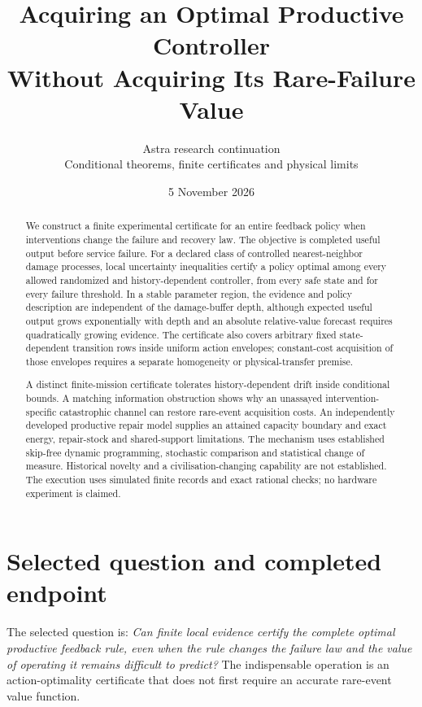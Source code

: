 \documentclass[10pt,a4paper]{article}
\title{Acquiring an Optimal Productive Controller\\Without Acquiring Its Rare-Failure Value}
\author{Astra research continuation\\Conditional theorems, finite certificates and physical limits}
\date{5 November 2026}
\begin{document}
\maketitle
\begin{abstract}
We construct a finite experimental certificate for an entire feedback policy when interventions change the failure and recovery law. The objective is completed useful output before service failure. For a declared class of controlled nearest-neighbor damage processes, local uncertainty inequalities certify a policy optimal among every allowed randomized and history-dependent controller, from every safe state and for every failure threshold. In a stable parameter region, the evidence and policy description are independent of the damage-buffer depth, although expected useful output grows exponentially with depth and an absolute relative-value forecast requires quadratically growing evidence. The certificate also covers arbitrary fixed state-dependent transition rows inside uniform action envelopes; constant-cost acquisition of those envelopes requires a separate homogeneity or physical-transfer premise.

A distinct finite-mission certificate tolerates history-dependent drift inside conditional bounds. A matching information obstruction shows why an unassayed intervention-specific catastrophic channel can restore rare-event acquisition costs. An independently developed productive repair model supplies an attained capacity boundary and exact energy, repair-stock and shared-support limitations. The mechanism uses established skip-free dynamic programming, stochastic comparison and statistical change of measure. Historical novelty and a civilisation-changing capability are not established. The execution uses simulated finite records and exact rational checks; no hardware experiment is claimed.
\end{abstract}
\setcounter{tocdepth}{1}
{\small\tableofcontents}
\newpage

\section{Selected question and completed endpoint}

The selected question is: \emph{Can finite local evidence certify the complete optimal productive feedback rule, even when the rule changes the failure law and the value of operating it remains difficult to predict?} The indispensable operation is an action-optimality certificate that does not first require an accurate rare-event value function.
\end{document}
